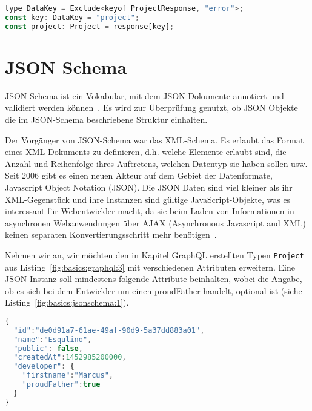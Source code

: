 \begin{lstlisting}[language=Javascript,float=h!,caption={Exclude zum Exkludieren von Schlüsseln}, label={fig:basics:typescript:6}]
type DataKey = Exclude<keyof ProjectResponse, "error">;
const key: DataKey = "project";
const project: Project = response[key];
\end{lstlisting}

\section{JSON Schema}
\label{sec:basics:jsonschema}
JSON-Schema ist ein Vokabular, mit dem JSON-Dokumente  annotiert und validiert werden können~\cite{json-schema}.
Es wird zur Überprüfung genutzt, ob JSON Objekte die im JSON-Schema beschriebene Struktur einhalten.

Der Vorgänger von JSON-Schema war das XML-Schema.
Es erlaubt das Format eines XML-Dokuments zu definieren,
d.h. welche Elemente erlaubt sind, die Anzahl und Reihenfolge ihres Auftretens, welchen Datentyp sie haben sollen usw.
Seit 2006 gibt es einen neuen Akteur auf dem Gebiet der Datenformate, Javascript Object Notation (JSON).
Die JSON Daten sind viel kleiner als ihr XML-Gegenstück und ihre Instanzen sind gültige JavaScript-Objekte, was es interessant für Webentwickler macht, da sie beim Laden von
Informationen in asynchronen Webanwendungen über AJAX (Asynchronous Javascript and XML) keinen separaten Konvertierungsschritt mehr benötigen~\cite{json-schema-xml}.

Nehmen wir an, wir möchten den in Kapitel GraphQL erstellten Typen \texttt{Project} aus Listing~\ref{fig:basics:graphql:3} mit verschiedenen Attributen erweitern.
Eine JSON Instanz soll mindestens folgende Attribute beinhalten, wobei die Angabe, ob es sich bei dem Entwickler um einen proudFather handelt, optional ist (siehe Listing~\ref{fig:basics:jsonschema:1}).

\begin{lstlisting}[language=Javascript,float=h!,caption={Ein Projekt als JSON Objekt}, label={fig:basics:jsonschema:1}]
{
  "id":"de0d91a7-61ae-49af-90d9-5a37dd883a01",
  "name":"Esqulino",
  "public": false,
  "createdAt":1452985200000,
  "developer": {
    "firstname":"Marcus",
    "proudFather":true
  }
}
\end{lstlisting}
\ \\
\ \\


